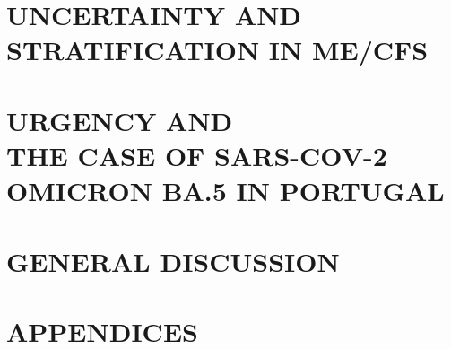 \documentclass[12pt,twoside]{book}
\begin{document}
\part[Uncertainty and stratification in ME/CFS]{UNCERTAINTY AND\\STRATIFICATION IN ME/CFS}
\label{part:mecfs}







\cleardoublepage
\part[Urgency and the case of SARS-CoV-2 Omicron BA.5 in Portugal]{URGENCY AND\\THE CASE OF SARS-COV-2\\OMICRON BA.5 IN PORTUGAL}
\label{part:covid}


\cleardoublepage
\part[General discussion]{GENERAL DISCUSSION}
\label{part:discussion}

\cleardoublepage
\cleardoublepage
\part[Appendices]{APPENDICES}
\label{appendix:appendix}
\appendix
\renewcommand{\thepage}{\thechapter.\arabic{page}}

\cleardoublepage

\cleardoublepage

\cleardoublepage

\cleardoublepage

\cleardoublepage

\cleardoublepage
\end{document}
